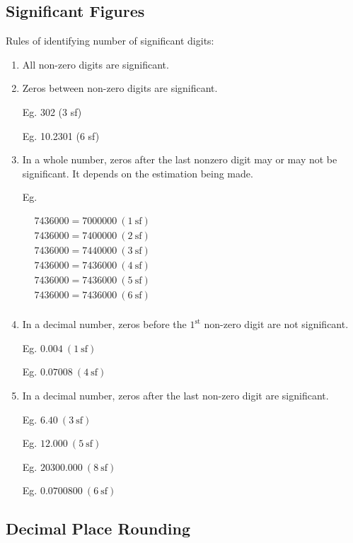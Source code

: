 \documentclass[twocolumn]{article}
\begin{document}
\subsection*{Significant Figures}

\noindent
Rules of identifying number of significant digits:

\begin{enumerate} 
\item All non-zero digits are significant.
\item Zeros between non-zero digits are significant. 

Eg. 302 (3 sf)

Eg. 10.2301 (6 sf)

\item In a whole number, zeros after the last nonzero digit may or may not be significant. It depends on the estimation being made.

Eg.

$
\begin{aligned}
	& 7436000=7000000 \ (1 \ \mathrm{sf}) \\
	& 7436000=7400000 \ (2 \ \mathrm{sf}) \\
	& 7436000=7440000 \ (3 \ \mathrm{sf}) \\
	& 7436000=7436000 \ (4 \ \mathrm{sf}) \\
	& 7436000=7436000 \ (5 \ \mathrm{sf}) \\
	& 7436000=7436000 \ (6 \ \mathrm{sf}) \\
\end{aligned}
$

\item In a decimal number, zeros before the $1^{\text{st}}$ non-zero digit are not significant.

Eg. $0.004 \ (1 \ \mathrm{sf})$

Eg. $0.07008 \ (4 \ \mathrm{sf})$

\item In a decimal number, zeros after the last non-zero digit are significant.

Eg. $6.40 \ (3 \ \mathrm{sf})$

Eg. $12.000 \ (5 \ \mathrm{sf})$

Eg. $20300.000 \ (8 \ \mathrm{sf})$

Eg. $0.0700800 \ (6 \ \mathrm{sf})$
\end{enumerate} 

\subsection*{Decimal Place Rounding}
\end{document}
